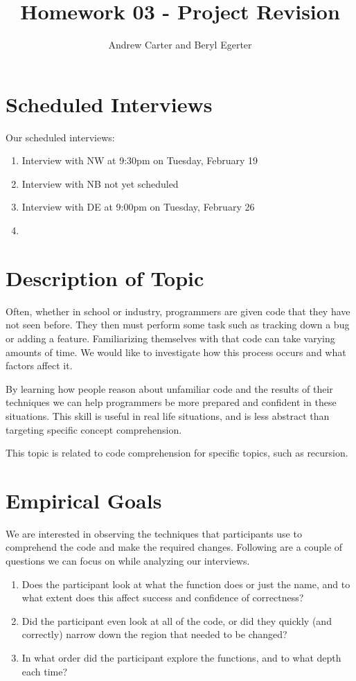\documentclass{article}
\title{Homework 03 - Project Revision}
\author{Andrew Carter and Beryl Egerter}
\begin{document}
\maketitle
\section{Scheduled Interviews}
Our scheduled interviews:
\begin{enumerate}
  \item Interview with NW at 9:30pm on Tuesday, February 19
  \item Interview with NB not yet scheduled
  \item Interview with DE at 9:00pm on Tuesday, February 26
  \item
\end{enumerate}
\section{Description of Topic}

Often, whether in school or industry, programmers are given code that they have not seen before.
They then must perform some task such as tracking down a bug or adding a feature.
Familiarizing themselves with that code can take varying amounts of time.
We would like to investigate how this process occurs and what factors affect it.

By learning how people reason about unfamiliar code and the results of their techniques we can help programmers be more prepared and confident in these situations.
This skill is useful in real life situations, and is less abstract than targeting specific concept comprehension.

This topic is related to code comprehension for specific topics, such as recursion.
\section{Empirical Goals}

We are interested in observing the techniques that participants use to comprehend the code and make the required changes. Following are a couple of questions we can focus on while analyzing our interviews.
\begin{enumerate}
	\item Does the participant look at what the function does or just the name, and to what extent does this affect success and confidence of correctness?
	\item Did the participant even look at all of the code, or did they quickly (and correctly) narrow down the region that needed to be changed?
	\item In what order did the participant explore the functions, and to what depth each time?
\end{enumerate}
\end{document}

